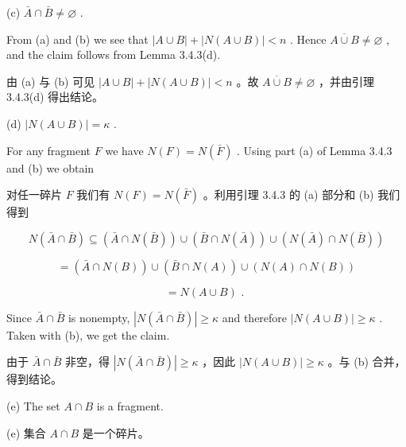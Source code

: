 \documentclass[10pt]{article}
\begin{document}
(c) \(\bar{A} \cap  \bar{B} \neq  \varnothing\) .

From (a) and (b) we see that \(\left| {A \cup  B}\right|  + \left| {N\left( {A \cup  B}\right) }\right|  < n\) . Hence \(\overline{A \cup  B} \neq  \varnothing\) , and the claim follows from Lemma 3.4.3(d).

\begin{tcolorbox}\relax
由 (a) 与 (b) 可见 \(\left| {A \cup  B}\right|  + \left| {N\left( {A \cup  B}\right) }\right|  < n\) 。故 \(\overline{A \cup  B} \neq  \varnothing\) ，并由引理 3.4.3(d) 得出结论。
\end{tcolorbox}

(d) \(\left| {N\left( {A \cup  B}\right) }\right|  = \kappa\) .

For any fragment \(F\) we have \(N\left( F\right)  = N\left( \bar{F}\right)\) . Using part (a) of Lemma 3.4.3 and (b) we obtain

\begin{tcolorbox}\relax
对任一碎片 \(F\) 我们有 \(N\left( F\right)  = N\left( \bar{F}\right)\) 。利用引理 3.4.3 的 (a) 部分和 (b) 我们得到
\end{tcolorbox}

\[
N\left( {\bar{A} \cap  \bar{B}}\right)  \subseteq  \left( {\bar{A} \cap  N\left( \bar{B}\right) }\right)  \cup  \left( {\bar{B} \cap  N\left( \bar{A}\right) }\right)  \cup  \left( {N\left( \bar{A}\right)  \cap  N\left( \bar{B}\right) }\right)
\]

\[
= \left( {\bar{A} \cap  N\left( B\right) }\right)  \cup  \left( {\bar{B} \cap  N\left( A\right) }\right)  \cup  \left( {N\left( A\right)  \cap  N\left( B\right) }\right)
\]

\[
= N\left( {A \cup  B}\right) \text{ . }
\]

Since \(\bar{A} \cap  \bar{B}\) is nonempty, \(\left| {N\left( {\bar{A} \cap  \bar{B}}\right) }\right|  \geq  \kappa\) and therefore \(\left| {N\left( {A \cup  B}\right) }\right|  \geq  \kappa\) . Taken with (b), we get the claim.

\begin{tcolorbox}\relax
由于 \(\bar{A} \cap  \bar{B}\) 非空，得 \(\left| {N\left( {\bar{A} \cap  \bar{B}}\right) }\right|  \geq  \kappa\) ，因此 \(\left| {N\left( {A \cup  B}\right) }\right|  \geq  \kappa\) 。与 (b) 合并，得到结论。
\end{tcolorbox}

(e) The set \(A \cap  B\) is a fragment.

\begin{tcolorbox}\relax
(e) 集合 \(A \cap  B\) 是一个碎片。
\end{tcolorbox}
\end{document}
